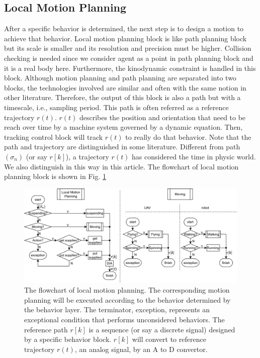 \documentclass{ieeeaccess}
\begin{document}
\subsection{Local Motion Planning}
After a specific behavior is determined, the next step is to design a motion to achieve that behavior. Local motion planning block is like path planning block but its scale is smaller and its resolution and precision must be higher. Collision checking is needed since we consider agent as a point in path planning block and it is a real body here. Furthermore, the kinodynamic constraint is handled in this block. Although motion planning and path planning are separated into two blocks, the technologies involved are similar and often with the same notion in other literature. Therefore, the output of this block is also a path but with a timescale, i.e., sampling period. This path is often referred as a reference trajectory $r(t)$. $r(t)$ describes the position and orientation that need to be reach over time by a machine system governed by a dynamic equation. Then, tracking control block will track $r(t)$ to really do that behavior. Note that the path and trajectory are distinguished in some literature. Different from path $(\sigma_n)$ (or say $r[k]$), a trajectory $r(t)$ has considered the time in physic world. We also distinguish in this way in this article. The flowchart of local motion planning block is shown in Fig. \ref{fig:LocalMotionPlanning}
\begin{figure}[htbp]
    \centering
    \includegraphics[scale=.4]{fig/LMP.pdf}\caption{The flowchart of local motion planning. The corresponding motion planning will be executed according to the behavior determined by the behavior layer. The terminator, exception, represents an exceptional condition that performs unconsidered behaviors. The reference path $r[k]$ is a sequence (or say a discrete signal) designed by a specific behavior block. $r[k]$ will convert to reference trajectory $r(t)$, an analog signal, by an A to D convertor.}
    \label{fig:LocalMotionPlanning}
\end{figure}
\end{document}
